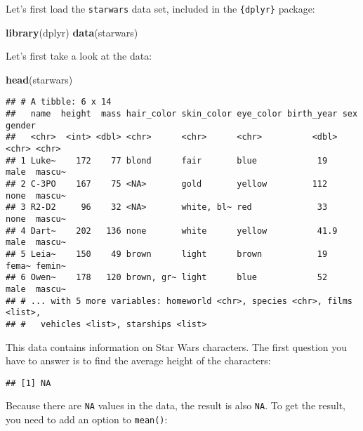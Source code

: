 \documentclass[
]{article}
\newenvironment{Shaded}{\begin{snugshade}}{\end{snugshade}}
\newcommand{\KeywordTok}[1]{\textcolor[rgb]{0.13,0.29,0.53}{\textbf{#1}}}
\newcommand{\NormalTok}[1]{#1}
\newcommand{\OperatorTok}[1]{\textcolor[rgb]{0.81,0.36,0.00}{\textbf{#1}}}
\begin{document}
Let's first load the \texttt{starwars} data set, included in the \texttt{\{dplyr\}} package:

\begin{Shaded}
\begin{Highlighting}[]
\KeywordTok{library}\NormalTok{(dplyr)}
\KeywordTok{data}\NormalTok{(starwars)}
\end{Highlighting}
\end{Shaded}

Let's first take a look at the data:

\begin{Shaded}
\begin{Highlighting}[]
\KeywordTok{head}\NormalTok{(starwars)}
\end{Highlighting}
\end{Shaded}

\begin{verbatim}
## # A tibble: 6 x 14
##   name  height  mass hair_color skin_color eye_color birth_year sex   gender
##   <chr>  <int> <dbl> <chr>      <chr>      <chr>          <dbl> <chr> <chr> 
## 1 Luke~    172    77 blond      fair       blue            19   male  mascu~
## 2 C-3PO    167    75 <NA>       gold       yellow         112   none  mascu~
## 3 R2-D2     96    32 <NA>       white, bl~ red             33   none  mascu~
## 4 Dart~    202   136 none       white      yellow          41.9 male  mascu~
## 5 Leia~    150    49 brown      light      brown           19   fema~ femin~
## 6 Owen~    178   120 brown, gr~ light      blue            52   male  mascu~
## # ... with 5 more variables: homeworld <chr>, species <chr>, films <list>,
## #   vehicles <list>, starships <list>
\end{verbatim}

This data contains information on Star Wars characters. The first question you have to answer is
to find the average height of the characters:

\begin{Shaded}
\end{Shaded}

\begin{verbatim}
## [1] NA
\end{verbatim}

Because there are \texttt{NA} values in the data, the result is also \texttt{NA}. To get the result, you need to
add an option to \texttt{mean()}:
\end{document}
